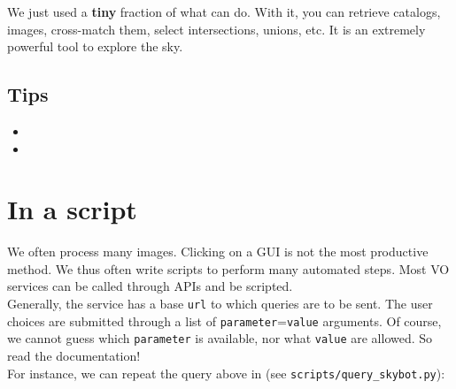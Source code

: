   \setcounter{saveitem}{\value{enumi}}  

  We just used a \textbf{tiny} fraction of what \aladin can do.
  With it, you can retrieve catalogs, images, cross-match them,
  select intersections, unions, etc. It is an extremely powerful
  tool to explore the sky.

\subsection*{Tips}

\begin{itemize}[label=]
	\item {}
	\item {}
\end{itemize}




\section{In a script}

We often process many images. Clicking on a GUI is not the most
productive method. We thus often write scripts to perform
many automated steps. Most VO services can be called through APIs
and be scripted.\\

Generally, the service has a base \texttt{url} to which queries are
to be sent. The user choices are submitted through a list of \texttt{parameter}=\texttt{value}
arguments. Of course, we cannot guess which \texttt{parameter} is
available, nor what \texttt{value} are allowed. So read the documentation!\\

For instance, we can repeat the query above in \python (see \texttt{scripts/query\_skybot.py}):

